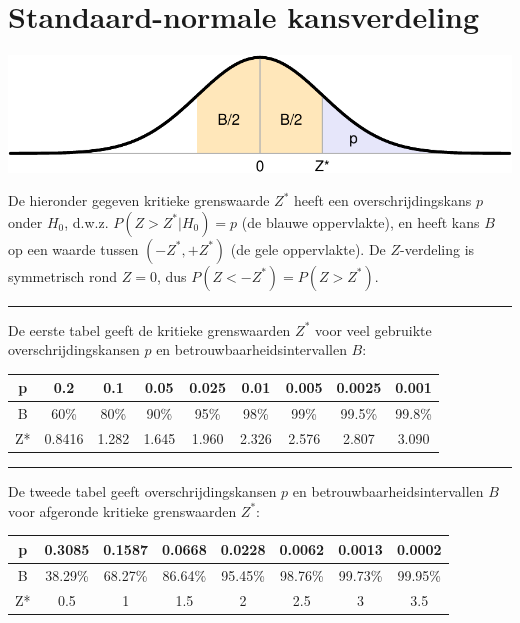 \documentclass[
]{book}
\begin{document}
\hypertarget{app:kritiekeZwaarden}{%
\chapter{Standaard-normale kansverdeling}\label{app:kritiekeZwaarden}}

\includegraphics{KMS-NL_files/figure-latex/kritiekeZwaarden-hulpfiguur-1.pdf}

De hieronder gegeven kritieke grenswaarde \(Z^*\) heeft een overschrijdingskans \(p\) onder \(H_0\),
d.w.z. \(P(Z > Z^*|H_0)=p\) (de blauwe oppervlakte),
en heeft kans \(B\) op een waarde tussen \((-Z^*, +Z^*)\) (de gele oppervlakte).
De \(Z\)-verdeling is symmetrisch rond \(Z=0\), dus \(P(Z < -Z^*) = P(Z > Z^*)\).

\begin{center}\rule{0.5\linewidth}{0.5pt}\end{center}

De eerste tabel geeft de kritieke grenswaarden \(Z^*\) voor veel gebruikte overschrijdingskansen \(p\) en betrouwbaarheidsintervallen \(B\):

\begin{tabular}{ccccccccc}
\toprule
p & 0.2 & 0.1 & 0.05 & 0.025 & 0.01 & 0.005 & 0.0025 & 0.001\\
\midrule
B & 60\% & 80\% & 90\% & 95\% & 98\% & 99\% & 99.5\% & 99.8\%\\
Z* & 0.8416 & 1.282 & 1.645 & 1.960 & 2.326 & 2.576 & 2.807 & 3.090\\
\bottomrule
\end{tabular}

\begin{center}\rule{0.5\linewidth}{0.5pt}\end{center}

De tweede tabel geeft overschrijdingskansen \(p\) en betrouwbaarheidsintervallen \(B\) voor afgeronde kritieke grenswaarden \(Z^*\):

\begin{tabular}{cccccccc}
\toprule
p & 0.3085 & 0.1587 & 0.0668 & 0.0228 & 0.0062 & 0.0013 & 0.0002\\
\midrule
B & 38.29\% & 68.27\% & 86.64\% & 95.45\% & 98.76\% & 99.73\% & 99.95\%\\
Z* & 0.5 & 1 & 1.5 & 2 & 2.5 & 3 & 3.5\\
\bottomrule
\end{tabular}
\end{document}
